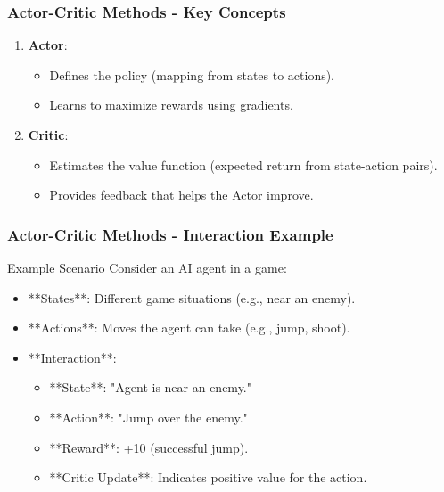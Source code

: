 \documentclass[aspectratio=169]{beamer}
\begin{document}
\begin{frame}[fragile]
    \frametitle{Actor-Critic Methods - Key Concepts}
    \begin{enumerate}
        \item \textbf{Actor}:
            \begin{itemize}
                \item Defines the policy (mapping from states to actions).
                \item Learns to maximize rewards using gradients.
            \end{itemize}
        \item \textbf{Critic}:
            \begin{itemize}
                \item Estimates the value function (expected return from state-action pairs).
                \item Provides feedback that helps the Actor improve.
            \end{itemize}
    \end{enumerate}
\end{frame}

\begin{frame}[fragile]
    \frametitle{Actor-Critic Methods - Interaction Example}
    \begin{block}{Example Scenario}
        Consider an AI agent in a game:
        \begin{itemize}
            \item **States**: Different game situations (e.g., near an enemy).
            \item **Actions**: Moves the agent can take (e.g., jump, shoot).
            \item **Interaction**:
                \begin{itemize}
                    \item **State**: "Agent is near an enemy."
                    \item **Action**: "Jump over the enemy."
                    \item **Reward**: +10 (successful jump).
                    \item **Critic Update**: Indicates positive value for the action.
                \end{itemize}
        \end{itemize}
    \end{block}
\end{frame}
\end{document}
